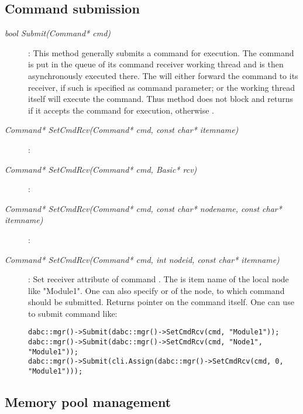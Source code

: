 \subsection{Command submission}	 
\label{prog_manager_framework_commands}	
\begin{description}
 
\item[\em bool Submit\small (Command* cmd)] :
This method generally submits a command  for execution.
The command is put in the queue of its command receiver working thread and is
then asynchronously executed there. The  will either forward the command
to its receiver, if such is specified as command parameter; or the  working thread itself will execute the command.
Thus method does not block and returns  if it accepts the command for execution, otherwise . 
      

\item[\em Command* SetCmdRcv\small (Command* cmd, const char* itemname)] :
\item[\em Command* SetCmdRcv\small (Command* cmd, Basic* rcv)] :
\item[\em Command* SetCmdRcv\small (Command* cmd, const char* nodename, const char* itemname)] :
\item[\em Command* SetCmdRcv\small (Command* cmd, int nodeid, const char* itemname)] :
Set receiver attribute of command . The  is
item name of the local node like "Module1". One can also specify 
 or  of the node, to which command should be submitted.
Returns pointer on the command itself.
One can use  to submit command like:
\begin{small}
\begin{verbatim}
dabc::mgr()->Submit(dabc::mgr()->SetCmdRcv(cmd, "Module1"));
dabc::mgr()->Submit(dabc::mgr()->SetCmdRcv(cmd, "Node1", "Module1"));
dabc::mgr()->Submit(cli.Assign(dabc::mgr()->SetCmdRcv(cmd, 0, "Module1")));
\end{verbatim}
\end{small}


\end{description}
 
\subsection{Memory pool management}	 	   

